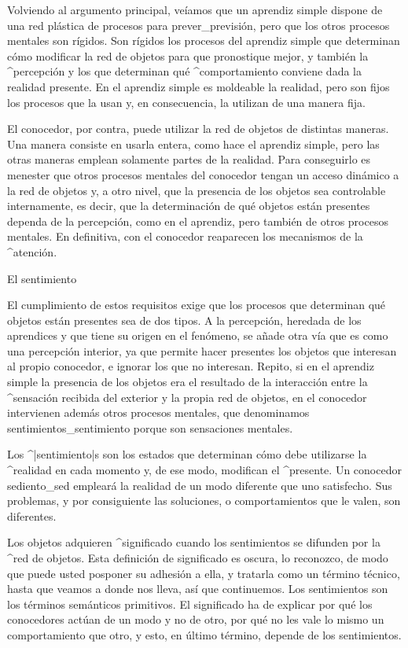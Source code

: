Volviendo al argumento principal, veíamos que un aprendiz simple dispone
de una red plástica de procesos para prever_{previsión}, pero que los
otros procesos mentales son rígidos. Son rígidos los procesos del
aprendiz simple que determinan cómo modificar la red de objetos para que
pronostique mejor, y también la ^{percepción} y los que determinan qué
^{comportamiento} conviene dada la realidad presente. En el aprendiz
simple es moldeable la realidad, pero son fijos los procesos que la usan
y, en consecuencia, la utilizan de una manera fija.

El conocedor, por contra, puede utilizar la red de objetos de distintas
maneras. Una manera consiste en usarla entera, como hace el aprendiz
simple, pero las otras maneras emplean solamente partes de la realidad.
Para conseguirlo es menester que otros procesos mentales del conocedor
tengan un acceso dinámico a la red de objetos y, a otro nivel, que la
presencia de los objetos sea controlable internamente, es decir, que la
determinación de qué objetos están presentes dependa de la percepción,
como en el aprendiz, pero también de otros procesos mentales. En
definitiva, con el conocedor reaparecen los mecanismos de la
^{atención}.


\Section El sentimiento

El cumplimiento de estos requisitos exige que los procesos que
determinan qué objetos están presentes sea de dos tipos. A la
percepción, heredada de los aprendices y que tiene su origen en el
fenómeno, se añade otra vía que es como una percepción interior, ya que
permite hacer presentes los objetos que interesan al propio conocedor, e
ignorar los que no interesan. Repito, si en el aprendiz simple la
presencia de los objetos era el resultado de la interacción entre la
^{sensación} recibida del exterior y la propia red de objetos, en el
conocedor intervienen además otros procesos mentales, que denominamos
sentimientos_{sentimiento} porque son sensaciones mentales.

Los ^|sentimiento|s son los estados que determinan cómo debe utilizarse
la ^{realidad} en cada momento y, de ese modo, modifican el ^{presente}.
Un conocedor sediento_{sed} empleará la realidad de un modo diferente
que uno satisfecho. Sus problemas, y por consiguiente las soluciones, o
comportamientos que le valen, son diferentes.

Los objetos adquieren ^{significado} cuando los sentimientos se difunden
por la ^{red de objetos}. Esta definición de significado es oscura, lo
reconozco, de modo que puede usted posponer su adhesión a ella, y
tratarla como un término técnico, hasta que veamos a donde nos lleva,
así que continuemos. Los sentimientos son los términos semánticos
primitivos. El significado ha de explicar por qué los conocedores actúan
de un modo y no de otro, por qué no les vale lo mismo un comportamiento
que otro, y esto, en último término, depende de los sentimientos.

